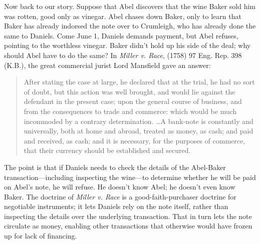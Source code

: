 Now back to our story. Suppose that Abel discovers that the wine Baker sold him
was rotten, good only as vinegar. Abel chases down Baker, only to learn that
Baker has already indorsed the note over to Crumleigh, who has already done the
same to Daniels. Come June 1, Daniels demands payment, but Abel refuses,
pointing to the worthless vinegar. Baker didn't hold up his side of the deal;
why should Abel have to do the same? In \textit{Miller v. Race}, (1758) 97 Eng.
Rep. 398 (K.B.), the great commercial jurist Lord Mansfield gave an answer:
\begin{quote}
After stating the case at large, he declared that at the trial, he had no sort
of doubt, but this action was well brought, and would lie against the defendant
in the present case; upon the general course of business, and from the
consequences to trade and commerce: which would be much incommoded by a
contrary determination. \ldots A bank-note is constantly and universally, both
at home and abroad, treated as money, as cash; and paid and received, as cash;
and it is necessary, for the purposes of commerce, that their currency should
be established and secured.
\end{quote}
The point is that if Daniels needs to check the details of the Abel-Baker
transaction---including inspecting the wine---to determine whether he will be
paid on Abel's note, he will refuse. He doesn't know Abel; he doesn't even know
Baker. The doctrine of \textit{Miller v. Race} is a good-faith-purchaser
doctrine for negotiable instruments; it lets Daniels rely on the note itself,
rather than inspecting the details over the underlying transaction. That in
turn lets the note circulate as money, enabling other transactions that
otherwise would have frozen up for lack of financing.

